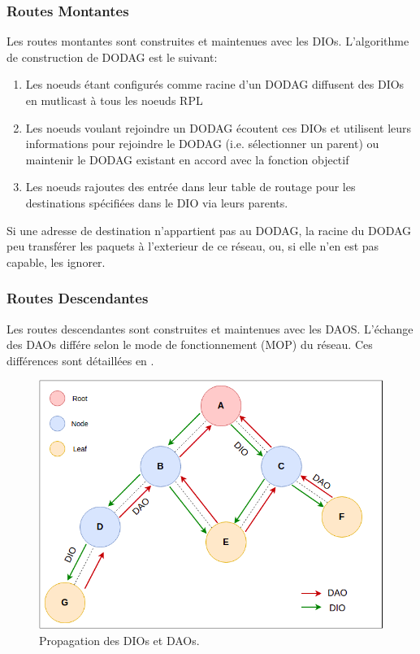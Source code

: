 \subsubsection*{Routes Montantes}
    Les routes montantes sont construites et maintenues avec les DIOs.
    L'algorithme de construction de DODAG est le suivant:
    \begin{enumerate}
        \item Les noeuds étant configurés comme racine d'un DODAG diffusent des DIOs en mutlicast à tous les noeuds RPL
        \item Les noeuds voulant rejoindre un DODAG écoutent ces DIOs et utilisent leurs informations pour rejoindre le DODAG (i.e. sélectionner un parent) ou maintenir le DODAG existant en accord avec la fonction objectif
        \item Les noeuds rajoutes des entrée dans leur table de routage pour les destinations spécifiées dans le DIO via leurs parents.
    \end{enumerate}

    Si une adresse de destination n'appartient pas au DODAG, la racine du DODAG peu transférer les paquets à l'exterieur de ce réseau, ou, si elle n'en est pas capable, les ignorer.     

\subsubsection*{Routes Descendantes}
    Les routes descendantes sont construites et maintenues avec les DAOS.
    L'échange des DAOs différe selon le mode de fonctionnement (MOP) du réseau. Ces différences sont détaillées en .

\begin{figure}[H]
    \centering
    \includegraphics[scale=0.5]{res/pictures/dao-dio.drawio.png}
    \caption{Propagation des DIOs et DAOs.}
    \label{fig:state-dio-dao}
\end{figure}

